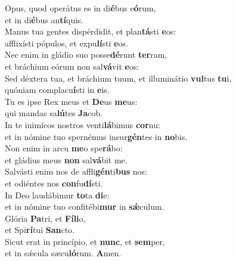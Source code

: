 \evenverse Opus, quod operátus es in di\textbf{é}bus e\textbf{ó}rum,~\*\\
\evenverse et in di\textbf{é}bus an\textbf{tí}quis.\\
\oddverse Manus tua gentes dispérdidit, et plan\textbf{tá}sti \textbf{e}os:~\*\\
\oddverse afflixísti pópulos, et expu\textbf{lí}sti \textbf{e}os.\\
\evenverse Nec enim in gládio suo posse\textbf{dé}runt \textbf{ter}ram,~\*\\
\evenverse et bráchium eórum non sal\textbf{vá}vit \textbf{e}os:\\
\oddverse Sed déxtera tua, et bráchium tuum, et illuminátio \textbf{vul}tus \textbf{tu}i,~\*\\
\oddverse quóniam complacu\textbf{í}sti in \textbf{e}is.\\
\evenverse Tu es ipse Rex meus et \textbf{De}us \textbf{me}us:~\*\\
\evenverse qui mandas sa\textbf{lú}tes \textbf{Ja}cob.\\
\oddverse In te inimícos nostros venti\textbf{lá}bimus \textbf{cor}nu:~\*\\
\oddverse et in nómine tuo spernémus insur\textbf{gén}tes in \textbf{no}bis.\\
\evenverse Non enim in arcu \textbf{me}o spe\textbf{rá}bo:~\*\\
\evenverse et gládius meus \textbf{non} sal\textbf{vá}bit me.\\
\oddverse Salvásti enim nos de affli\textbf{gén}ti\textbf{bus} nos:~\*\\
\oddverse et odiéntes nos \textbf{con}fu\textbf{dí}sti.\\
\evenverse In Deo laudábimur \textbf{to}ta \textbf{di}e:~\*\\
\evenverse et in nómine tuo confitébi\textbf{mur} in \textbf{sǽ}culum.\\
\oddverse Glória \textbf{Pa}tri, et \textbf{Fí}\textbf{li}o,~\*\\
\oddverse et Spi\textbf{rí}tui \textbf{San}cto.\\
\evenverse Sicut erat in princípio, et \textbf{nunc}, et \textbf{sem}per,~\*\\
\evenverse et in sǽcula sæcu\textbf{ló}rum. \textbf{A}men.\\
